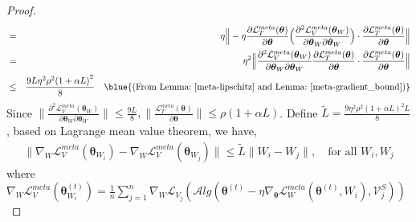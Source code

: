 \begin{proof}
\begin{eqnarray}
     &=& \eta \Big\|-\eta \frac{\partial \mathcal{L}_T^{meta}(\boldsymbol{\theta})}{\partial \boldsymbol{\theta}} \Big( \frac{\partial^2 \mathcal{L}_V^{meta}(\boldsymbol{\theta}_W)}{\partial \boldsymbol{\theta}_W\partial \boldsymbol{\theta}_W}\Big) \cdot \frac{\partial\mathcal{L}_T^{meta}(\boldsymbol{\theta})}{\partial \boldsymbol{\theta}}\Big\|  \nonumber \\
       &=& \eta^2 \Big\| \frac{\partial^2 \mathcal{L}_V^{meta}(\boldsymbol{\theta}_W)}{\partial \boldsymbol{\theta}_W \partial \boldsymbol{\theta}_W} \frac{\partial\mathcal{L}_T^{meta}(\boldsymbol{\theta})}{\partial \boldsymbol{\theta}} \cdot \frac{\partial \mathcal{L}_T^{meta}(\boldsymbol{\theta})}{\partial \boldsymbol{\theta}}\Big\|  \nonumber \\
       &\le & \frac{9L\eta^2 \rho^2 {(1+\alpha L)}^2}{8} \quad \blue{\text{(From Lemma:~\ref{meta-lipschitz} and Lemma:~\ref{meta-gradient_bound})}} \nonumber\\
\end{eqnarray}
Since $\|\frac{\partial^2 \mathcal{L}^{meta}_V(\boldsymbol{\theta}_W)}{\partial \boldsymbol{\theta}_W \partial \boldsymbol{\theta}_W}\|\le \frac{9L}{8}, \|\frac{\mathcal{L}_T^{meta}(\boldsymbol{\theta})}{\partial \boldsymbol{\theta}}\| \le \rho(1+\alpha L)$. Define $\tilde{L} = \frac{9\eta^2 \rho^2 {(1+\alpha L)}^2 L}{8} $, based on Lagrange mean value theorem, we have,
\begin{eqnarray}
    \|\nabla_W \mathcal{L}_V^{meta}(\boldsymbol{\theta}_{W_i}) - \nabla_W \mathcal{L}_V^{meta}(\boldsymbol{\theta}_{W_j}) \| \le \tilde{L} \|W_i-W_j\|, \quad \text{for all } W_i, W_j
\end{eqnarray}
where $\nabla_W \mathcal{L}_{V}^{meta}(\boldsymbol{\theta}^{(t)}_{W_i}) = \frac{1}{n}\sum_{j=1}^{n}\nabla_W \mathcal{L}_{V_j}(\mathcal{A}lg(\boldsymbol{\theta}^{(t)} - \eta \nabla_{\boldsymbol{\theta}}\mathcal{L}_{W}^{meta}(\boldsymbol{\theta}^{(t)}, W_i),\mathcal{V}_j^{S}))$
\end{proof}

